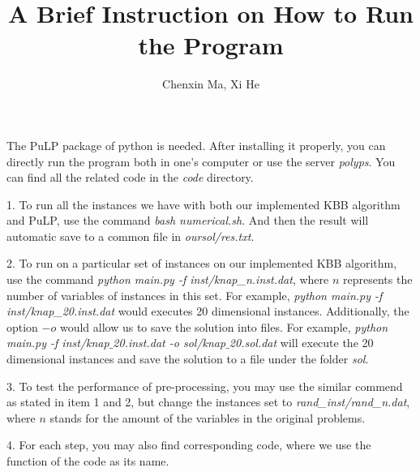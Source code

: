 \documentclass[a4paper,10pt]{article}
\title{A Brief Instruction on How to Run the Program}
\author{Chenxin Ma, Xi He}
\begin{document}
\maketitle

The PuLP package of python is needed. After installing it properly, you can directly run the program both in one's computer or use the server \textit{polyps}. You can find all the related code in the \textit{code} directory. 

\begin{description}
\item{1.} To run all the instances we have with both our implemented KBB algorithm and PuLP, use the command \textit{bash numerical.sh}. And then the result will automatic save to a common file in \textit{oursol/res.txt}.
\item{2.} To run on a particular set of instances on our implemented KBB algorithm, use the command \textit{python main.py -f inst/knap\_n.inst.dat}, where $n$ represents the number of variables of instances in this set. For example, \textit{python main.py -f inst/knap\_20.inst.dat} would executes 20 dimensional instances. Additionally, the option $-o$ would allow us to save the solution into files. For example, \textit{python main.py -f inst/knap$\_$20.inst.dat -o sol/knap$\_$20.sol.dat} will execute the 20 dimensional instances and save the solution to a file under the folder \textit{sol}. 
\item{3.} To test the performance of pre-processing, you may use the similar commend as stated in item 1 and  2, but change the instances set to \textit{rand\_inst/rand\_n.dat}, where $n$ stands for the amount of the variables in the original problems.
\item{4.} For each step, you may also find corresponding code, where we use the function of the code as its name.
\end{description}
\end{document}
